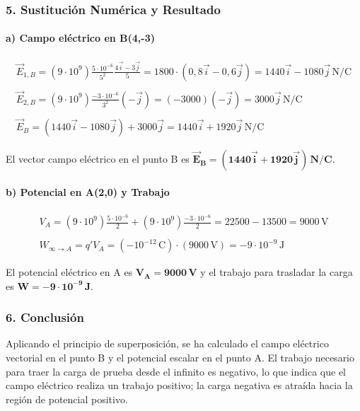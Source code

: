 \subsubsection*{5. Sustitución Numérica y Resultado}
\paragraph{a) Campo eléctrico en B(4,-3)}
\begin{gather}
    \vec{E}_{1,B} = (9\cdot10^9)\frac{5\cdot10^{-6}}{5^2}\frac{4\vec{i}-3\vec{j}}{5} = 1800 \cdot (0,8\vec{i}-0,6\vec{j}) = 1440\vec{i} - 1080\vec{j}\,\text{N/C} \\
   \\ \vec{E}_{2,B} = (9\cdot10^9)\frac{-3\cdot10^{-6}}{3^2}(-\vec{j}) = (-3000)(-\vec{j}) = 3000\vec{j}\,\text{N/C} \\
   \\ \vec{E}_B = (1440\vec{i} - 1080\vec{j}) + 3000\vec{j} = 1440\vec{i} + 1920\vec{j}\,\text{N/C}
\end{gather}
\begin{cajaresultado}
El vector campo eléctrico en el punto B es $\boldsymbol{\vec{E}_B = (1440\vec{i} + 1920\vec{j})\,\textbf{N/C}}$.
\end{cajaresultado}

\paragraph{b) Potencial en A(2,0) y Trabajo}
\begin{gather}
    V_A = (9\cdot10^9)\frac{5\cdot10^{-6}}{2} + (9\cdot10^9)\frac{-3\cdot10^{-6}}{2} = 22500 - 13500 = 9000\,\text{V} \\
\\    W_{\infty \to A} = q'V_A = (-10^{-12}\,\text{C}) \cdot (9000\,\text{V}) = -9 \cdot 10^{-9}\,\text{J}
\end{gather}
\begin{cajaresultado}
El potencial eléctrico en A es $\boldsymbol{V_A = 9000\,\textbf{V}}$ y el trabajo para trasladar la carga es $\boldsymbol{W = -9 \cdot 10^{-9}\,\textbf{J}}$.
\end{cajaresultado}

\subsubsection*{6. Conclusión}
\begin{cajaconclusion}
Aplicando el principio de superposición, se ha calculado el campo eléctrico vectorial en el punto B y el potencial escalar en el punto A. El trabajo necesario para traer la carga de prueba desde el infinito es negativo, lo que indica que el campo eléctrico realiza un trabajo positivo; la carga negativa es atraída hacia la región de potencial positivo.
\end{cajaconclusion}

